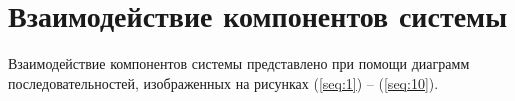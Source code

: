 \section{Взаимодействие компонентов системы}

Взаимодействие компонентов системы представлено при помощи диаграмм последовательностей, изображенных на рисунках (\ref{seq:1}) -- (\ref{seq:10}). 

\begin{figure}[ht!]
\end{figure}
\begin{figure}[ht!]
\end{figure}
